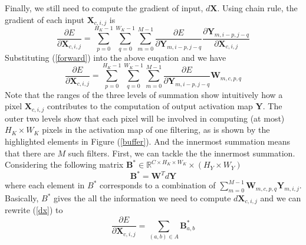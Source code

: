 \documentclass[authordraft=true,dvipsnames]{acmart}
\newcommand{\pref}[1]{(\ref{#1})}
\newcommand{\bx}[0]{\mathbf{X}}
\newcommand{\bw}[0]{\mathbf{W}}
\newcommand{\by}[0]{\mathbf{Y}}
\newcommand{\bb}[0]{\mathbf{B}}
\begin{document}
Finally, we still need to compute the gradient of input, $d\bx$. Using chain rule, the gradient of each input $\mathbf{X}_{c,i,j}$ is 
\begin{equation}
\frac{\partial E}{\partial \bx_{c,i,j}} = \sum_{p=0}^{H_K-1}{\sum_{q=0}^{W_K-1}{\sum_{m=0}^{M-1}{\frac{\partial E}{\partial \by_{m,i-p,j-q}}\frac{\partial \mathbf{Y}_{m,i-p,j-q}}{\partial \mathbf{X}_{c,i,j}}}}}
\end{equation}
Substituting \pref{forward} into the above euqation and we have
\begin{equation} \label{dx}
\frac{\partial E}{\partial \bx_{c,i,j}} = \sum_{p=0}^{H_K-1}{\sum_{q=0}^{W_K-1}{\sum_{m=0}^{M-1}{\frac{\partial E}{\partial \by_{m,i-p,j-q}} \bw_{m,c,p,q}}}}
\end{equation}
Note that the ranges of the three levels of summation show intuitively how a pixel $\bx_{c,i, j}$ contributes to the computation of output activation map $\by$. The outer two levels show that each pixel will be involved in computing (at most) $H_K \times W_K$ pixels in the activation map of one filtering, as is shown by the highlighted elements in Figure \pref{buffer}. And the innermost summation means that there are $M$ such filters. First, we can tackle the the innermost summation. 
Considering the following matrix $\bb^* \in \mathbb{R} ^ {C \times H_K \times W_K} \times (H_Y \times W_Y)$ 
\begin{equation} \label{rbb}
\bb^* = \bw^T d\by
\end{equation}
where each element in $B^*$ corresponds to a combination of $\sum_{m=0}^{M-1}{ \bw_{m,c,p,q}\by_{m,i,j} }$. Basically, $B^*$ gives the all the information we need to compute $d\bx_{c,i,j}$ and we can rewrite \pref{dx} to 
\begin{equation} \label{dx2}
\frac{\partial E}{\partial \bx_{c,i,j}} = \sum_{(a,b) \in A}{\bb^*_{a,b}}
\end{equation}
\end{document}
